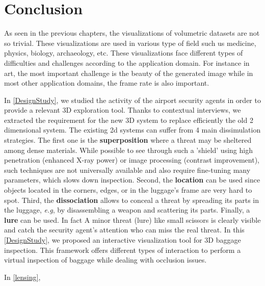 \chapter{ Conclusion }
\label{Conclusion}

As seen in the previous chapters, the visualizations of volumetric datasets are not so trivial. These visualizations are used in various type of field such us medicine, physics, biology, archaeology, etc. These visualizations face different types of difficulties and challenges according to the application domain. For instance in art, the most important challenge is the beauty of the generated image while in most other application domains, the frame rate is also important.

 
In \autoref{DesignStudy}, we studied the activity of the airport security agents in order to provide a relevant 3D exploration tool. Thanks to contextual interviews, we extracted the requirement for the new 3D system  to replace efficiently  the old 2 dimensional system. The existing 2d systems can suffer from 4 main dissimulation strategies. The first one is the \textbf{superposition} where a threat may be sheltered among dense materials. While possible to see through such a 'shield' using high penetration (enhanced X-ray power) or image processing (contrast improvement), such techniques are not universally available and also require fine-tuning many parameters, which slows down inspection. Second, the \textbf{location} can be used since objects located in the corners, edges, or in the luggage's frame are very hard to spot. Third, the \textbf{dissociation} allows to conceal a threat by spreading its parts in the luggage, \emph{e.g}, by disassembling a weapon and scattering its parts. Finally, a \textbf{lure} can be used. In fact A minor threat (lure) like small scissors is clearly visible and catch the security agent's attention who can miss the real threat. In this \autoref{DesignStudy}, we proposed an interactive visualization tool for 3D baggage inspection. This framework offers different types of interaction to perform a virtual inspection of baggage while dealing with occlusion issues.


In \autoref{lensing}, 

